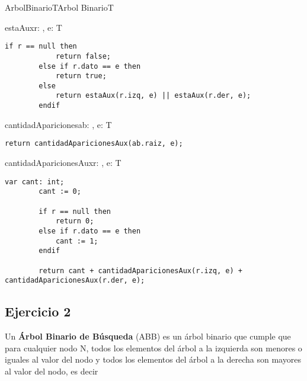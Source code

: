 \begin{module}{ArbolBinario}{T}{Arbol Binario}{T}
	\begin{proc}{estaAux}{\In r: \nodo, \In e: T}{\bool}
		\begin{lstlisting}[numbers=none,frame=none]
		if r == null then
			return false;
		else if r.dato == e then
			return true;
		else
			return estaAux(r.izq, e) || estaAux(r.der, e);
		endif
		\end{lstlisting}
	\end{proc}

	\begin{proc}{cantidadApariciones}{\In ab: \moduletype, \In e: T}{\Int}
		\begin{lstlisting}[numbers=none,frame=none]
		return cantidadAparicionesAux(ab.raiz, e);
		\end{lstlisting}
	\end{proc}

	\begin{proc}{cantidadAparicionesAux}{\In r: \nodo, \In e: T}{\Int}
		\begin{lstlisting}[numbers=none,frame=none]
		var cant: int;
		cant := 0;

		if r == null then
			return 0;
		else if r.dato == e then
			cant := 1;
		endif
		
		return cant + cantidadAparicionesAux(r.izq, e) + cantidadAparicionesAux(r.der, e);
		\end{lstlisting}
	\end{proc}

\end{module}

\subsection{Ejercicio 2}
Un \textbf{Árbol Binario de Búsqueda} (ABB) es un árbol binario que cumple que para cualquier nodo N, todos los elementos del árbol a la izquierda son menores o iguales al valor del nodo y todos los elementos del árbol a la derecha son mayores al valor del nodo, es decir



